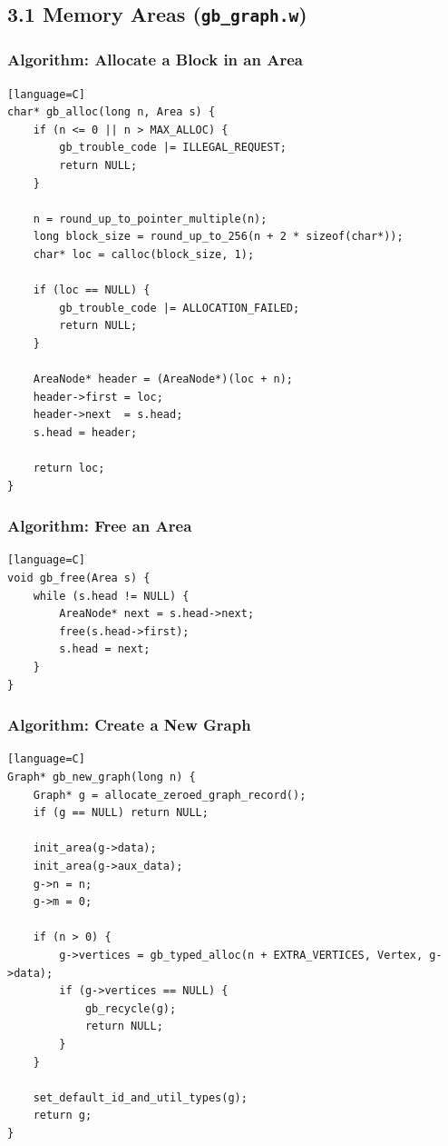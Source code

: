 \documentclass[11pt]{article}
\begin{document}
\subsection{\texorpdfstring{3.1 Memory Areas (\texttt{gb\_graph.w})}{3.1 Memory Areas (gb\_graph.w)}}\label{memory-areas-gb_graph.w}

\subsubsection{Algorithm: Allocate a Block in an Area}\label{algorithm-allocate-a-block-in-an-area}

\begin{verbatim}[language=C]
char* gb_alloc(long n, Area s) {
    if (n <= 0 || n > MAX_ALLOC) {
        gb_trouble_code |= ILLEGAL_REQUEST;
        return NULL;
    }

    n = round_up_to_pointer_multiple(n);
    long block_size = round_up_to_256(n + 2 * sizeof(char*));
    char* loc = calloc(block_size, 1);

    if (loc == NULL) {
        gb_trouble_code |= ALLOCATION_FAILED;
        return NULL;
    }

    AreaNode* header = (AreaNode*)(loc + n);
    header->first = loc;
    header->next  = s.head;
    s.head = header;

    return loc;
}
\end{verbatim}

\subsubsection{Algorithm: Free an Area}\label{algorithm-free-an-area}

\begin{verbatim}[language=C]
void gb_free(Area s) {
    while (s.head != NULL) {
        AreaNode* next = s.head->next;
        free(s.head->first);
        s.head = next;
    }
}
\end{verbatim}

\subsubsection{Algorithm: Create a New Graph}\label{algorithm-create-a-new-graph}

\begin{verbatim}[language=C]
Graph* gb_new_graph(long n) {
    Graph* g = allocate_zeroed_graph_record();
    if (g == NULL) return NULL;

    init_area(g->data);
    init_area(g->aux_data);
    g->n = n;
    g->m = 0;

    if (n > 0) {
        g->vertices = gb_typed_alloc(n + EXTRA_VERTICES, Vertex, g->data);
        if (g->vertices == NULL) {
            gb_recycle(g);
            return NULL;
        }
    }

    set_default_id_and_util_types(g);
    return g;
}
\end{verbatim}
\end{document}
